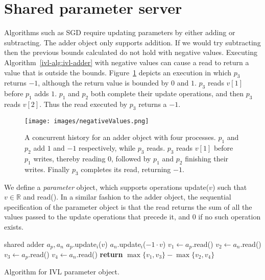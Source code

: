 \section{Shared parameter server}
\label{ivl-sec:shared-parameter-server}

Algorithms such as SGD require updating parameters by either adding
or subtracting. The adder object only supports addition. If we would try subtracting
then the previous bounds calculated do not hold with negative values. Executing
Algorithm~\ref{ivl-alg:ivl-adder} with negative values can cause a read to return a value
that is outside the bounds. Figure~\ref{ivl-img:negative-values} depicts an execution in which $p_3$ returns $-1$,
although the return value is bounded by $0$ and $1$. $p_3$ reads $v[1]$ before $p_1$
adds $1$. $p_1$ and $p_2$ both complete their {\sc update} operations, and then $p_3$
reads $v[2]$. Thus the {\sc read} executed by $p_3$ returns a $-1$.

\begin{figure}[b]
    \centering
    \texttt{[image: images/negativeValues.png]}
    \caption{A concurrent history for an adder object with four processes. $p_1$ and
    $p_2$ add $1$ and $-1$ respectively, while $p_3$ reads. $p_3$ reads $v[1]$
    before $p_1$ writes, thereby reading $0$, followed by $p_1$ and $p_2$ finishing their writes.
    Finally $p_3$ completes its read, returning $-1$.}
    \label{ivl-img:negative-values}
\end{figure}

We define a \emph{parameter} object, which supports operations {\sc update}($v$) such that $v \in \mathds{R}$ and
{\sc read}(). In a similar fashion to the adder object, the sequential specification
of the parameter object is that the read returns the sum of all the values passed to
the {\sc update} operations that precede it, and $0$ if no such operation exists.

\begin{algorithm}
    \begin{algorithmic}
        \State shared adder $a_p, a_n$ 
        \Statex
        \State $a_p$.{\sc update}$_i$($v$)
        \Else
        \State $a_n$.{\sc update}$_i$($-1 \cdot v$)
        \EndIf
        \EndProcedure
        \Statex
        \State $v_1 \gets a_p$.{\sc read}()
        \State $v_2 \gets a_n$.{\sc read}()
        \State $v_3 \gets a_p$.{\sc read}()
        \State $v_4 \gets a_n$.{\sc read}()
        \State \textbf{return} $\max \{v_1, v_3\} - \max \{v_2, v_4\}$
        \EndProcedure
    \end{algorithmic}
    \caption{Algorithm for IVL parameter object.}
    \label{ivl-alg:ivl-parameter}
\end{algorithm}

